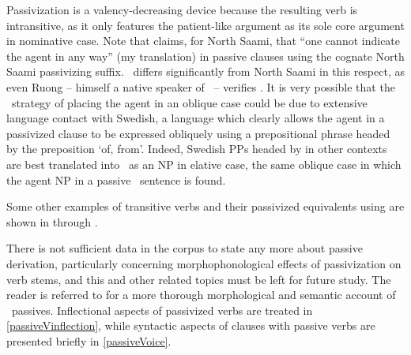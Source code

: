 Passivization is a valency-decreasing device because the resulting verb is intransitive, as it only features the patient-like argument as its sole core argument in nominative case. Note that \citet[92]{Svonni2009} claims, for North Saami, that “one cannot indicate the agent in any way” (my translation) in passive clauses using the cognate North Saami passivizing suffix. \PS\ differs significantly from North Saami in this respect, as even Ruong – himself a native speaker of \PS\ – verifies \citep[cf.][41]{Ruong1943}. It is very possible that the \PS\ strategy of placing the agent in an oblique case could be due to extensive language contact with Swedish, a language which clearly allows the agent in a passivized clause to be expressed obliquely using a prepositional phrase headed by the preposition  ‘of, from’. 
Indeed, Swedish PPs headed by  in other contexts are best translated into \PS\ as an NP in elative case, the same oblique case in which the agent NP in a passive \PS\ sentence is found. 

Some other examples of transitive verbs and their passivized equivalents using  are shown in  through .
\ea\label{vblzDUVVex1}
\z
\ea\label{vblzDUVVex2}
\z
\ea\label{vblzDUVVex3}
\z

There is not sufficient data in the corpus to state any more about passive derivation, particularly concerning morphophonological effects of passivization on verb stems, and this and other related topics must be left for future study. The reader is referred to \citet{Ruong1943} for a more thorough morphological and semantic account of \PS\ passives. 
Inflectional aspects of passivized verbs are treated in \ref{passiveVinflection}, while syntactic aspects of clauses with passive verbs are presented briefly in \ref{passiveVoice}. 

